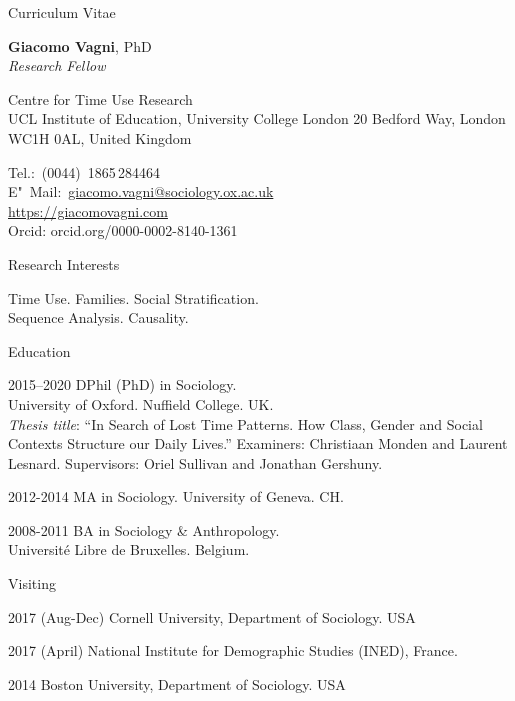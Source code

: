 \documentclass[12pt,a4paper]{article}
\begin{document}
\begin{cv}{Curriculum Vitae}
  \begin{cvlist}{}
  \item \textbf{Giacomo Vagni}, PhD\\
  \emph{Research Fellow}
   
   \item Centre for Time Use Research \\
    UCL Institute of Education, University College London
    20 Bedford Way, London WC1H 0AL, United Kingdom
  \item Tel.:~(0044)~1865\,284464\\
    E"~Mail:~\href{mailto:giacomo.vagni@sociology.ox.ac.uk}{giacomo.vagni@sociology.ox.ac.uk} \\ 
    \href{https://giacomovagni.com} {https://giacomovagni.com} \\
    Orcid: orcid.org/0000-0002-8140-1361
    
   \end{cvlist}
  
  \begin{cvlist}{Research Interests}
  \item[] Time Use. Families. Social Stratification. \\  Sequence Analysis. Causality. 
  \end{cvlist}
  
  \begin{cvlist}{Education}
  \item[2015--2020] DPhil (PhD) in Sociology. \\ University of Oxford. Nuffield College. UK. \\ \emph{Thesis title}: ``In Search of Lost Time Patterns. How Class, Gender and Social Contexts Structure our Daily Lives.'' Examiners: Christiaan Monden and Laurent Lesnard. Supervisors: Oriel Sullivan and Jonathan Gershuny.
  
  \item[2012-2014] MA in Sociology. University of Geneva. CH. 
  \item[2008-2011] BA in Sociology \& Anthropology. \\ Universit{\'e} Libre de Bruxelles. Belgium. 
  \end{cvlist}
  
      \begin{cvlist}{Visiting}
      	\item[2017 (Aug-Dec)] Cornell University, Department of Sociology. USA 
      	\item[2017 (April)] National Institute for Demographic Studies (INED), France. 
      	\item[2014] Boston University, Department of Sociology. USA
      \end{cvlist}
      

\end{cv}
\end{document}
